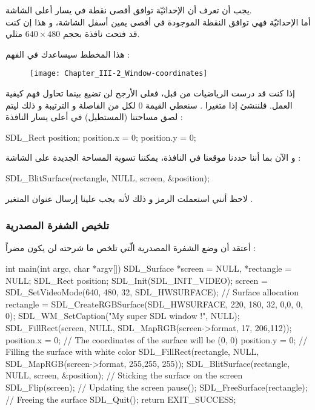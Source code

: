 يجب أن تعرف أن الإحداثيّة
توافق أقصى نقطة في يسار أعلى الشاشة.\\
أما الإحداثيّة 
فهي توافق النقطة الموجودة في أقصى يمين أسفل الشاشة، و هذا إن كنت قد فتحت نافذة بحجم
$640 \times 480$
مثلي.

هذا المخطط سيساعدك في الفهم  :

\begin{figure}[H]
	\centering
	\texttt{[image: Chapter\_III-2\_Window-coordinates]}
\end{figure}

إذا كنت قد درست الرياضيات من قبل، فعلى الأرجح لن تضيع بينما تحاول  فهم كيفية العمل. فلننشئ إذا متغيرا 
.
سنعطي القيمة 0 لكل من الفاصلة و الترتيبة و ذلك ليتم لصق مساحتنا (المستطيل) في أعلى يسار النافذة :

\begin{Csource}
SDL_Rect position;
position.x = 0;
position.y = 0;
\end{Csource}

و الآن بما أننا حددنا موقعنا في النافذة، يمكننا تسوية المساحة الجديدة على الشاشة :

\begin{Csource}
SDL_BlitSurface(rectangle, NULL, screen, &position);
\end{Csource}
 
لاحظ أنني استعملت الرمز
\InlineCode{\&}
و ذلك لأنه يجب علينا إرسال عنوان المتغير
.

\subsubsection{تلخيص الشفرة المصدرية}

أعتقد أن وضع الشفرة المصدرية الّتي تلخص ما شرحته لن يكون مضراً :

\begin{Csource}
int main(int argc, char *argv[])
{
	SDL_Surface *screen = NULL, *rectangle = NULL;
	SDL_Rect position;
	SDL_Init(SDL_INIT_VIDEO);
	screen = SDL_SetVideoMode(640, 480, 32, SDL_HWSURFACE);
	// Surface allocation
	rectangle = SDL_CreateRGBSurface(SDL_HWSURFACE, 220, 180, 32, 0,0, 0, 0);
	SDL_WM_SetCaption("My super SDL window !", NULL);
	SDL_FillRect(screen, NULL, SDL_MapRGB(screen->format, 17, 206,112));
	position.x = 0; // The coordinates of the surface will be (0, 0)
	position.y = 0;
	// Filling the surface with white color
	SDL_FillRect(rectangle, NULL, SDL_MapRGB(screen->format, 255,255, 255));
	SDL_BlitSurface(rectangle, NULL, screen, &position); // Sticking the surface on the screen 
	SDL_Flip(screen); // Updating the screen
	pause();
	SDL_FreeSurface(rectangle); // Freeing the surface
	SDL_Quit();
	return EXIT_SUCCESS;
}
\end{Csource}


